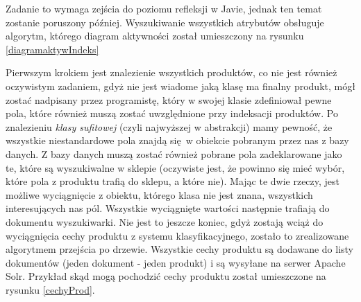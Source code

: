 Zadanie to wymaga zejścia do poziomu refleksji w Javie, jednak ten temat zostanie poruszony później. Wyszukiwanie wszystkich atrybutów obsługuje algorytm, którego diagram aktywności został umieszczony na rysunku \ref{diagramaktywIndeks}

Pierwszym krokiem jest znalezienie wszystkich produktów, co nie jest również oczywistym zadaniem, gdyż nie jest wiadome jaką klasę ma finalny produkt, mógł zostać nadpisany przez programistę, który w swojej klasie zdefiniował pewne pola, które również muszą zostać uwzględnione przy indeksacji produktów. Po znalezieniu \textit{klasy sufitowej} (czyli najwyższej w abstrakcji) mamy pewność, że wszystkie niestandardowe pola znajdą się w obiekcie pobranym przez nas z bazy danych. Z bazy danych muszą zostać również pobrane pola zadeklarowane jako te, które są wyszukiwalne w sklepie (oczywiste jest, że powinno się mieć wybór, które pola z produktu trafią do sklepu, a które nie). Mając te dwie rzeczy, jest możliwe wyciągnięcie z obiektu, którego klasa nie jest znana, wszystkich interesujących nas pól. Wszystkie wyciągnięte wartości następnie trafiają do dokumentu wyszukiwarki. Nie jest to jeszcze koniec, gdyż zostają wciąż do wyciągnięcia cechy produktu z systemu klasyfikacyjnego, zostało to zrealizowane algorytmem przejścia po drzewie. Wszystkie cechy produktu są dodawane do listy dokumentów (jeden dokument - jeden produkt) i są wysyłane na serwer Apache Solr. Przykład skąd mogą pochodzić cechy produktu został umieszczone na rysunku \ref{cechyProd}.
